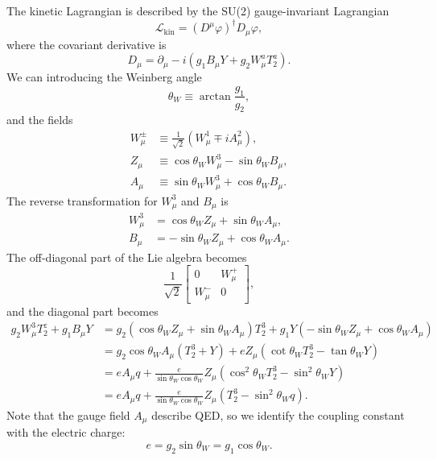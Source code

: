 \documentclass[aps,prb,superscriptaddress,nofootinbib]{revtex4}
\begin{document}
The kinetic Lagrangian is described by the SU(2) gauge-invariant Lagrangian
\begin{equation}
	\mathcal L_{\mathrm{kin}} = (D^\mu \varphi)^\dagger D_\mu \varphi,
\end{equation}
where the covariant derivative is
\begin{equation}
	D_\mu = \partial_\mu -i \left(g_1 B_\mu Y + g_2 W^a_\mu T_2^a\right).
\end{equation}
We can introducing the Weinberg angle
\begin{equation}
	\theta_W \equiv\arctan \frac{g_1}{g_2},
\end{equation}
and the fields
\begin{equation}
\begin{aligned}
	W_\mu^\pm &\equiv \frac{1}{\sqrt 2}(W^1_\mu \mp i A_\mu^2), \\
	Z_\mu &\equiv \cos{\theta_W} W^3_\mu - \sin{\theta_W} B_\mu, \\
	A_\mu &\equiv \sin{\theta_W} W_\mu^3 + \cos{\theta_W} B_\mu.
\end{aligned}
\end{equation}
The reverse transformation for $W_\mu^3$ and $B_\mu$ is
\begin{equation}
\begin{aligned}
	W_\mu^3 &= \cos{\theta_W} Z_\mu + \sin{\theta_W} A_\mu, \\
	B_\mu &= -\sin{\theta_W} Z_\mu +\cos{\theta_W} A_\mu.
\end{aligned}
\end{equation}
The off-diagonal part of the Lie algebra becomes
\begin{equation}
	\frac{1}{\sqrt 2}\begin{bmatrix}
		0 &  W^+_\mu \\
		W_\mu^- & 0
	\end{bmatrix},
\end{equation}
and the diagonal part becomes
\begin{equation}
\begin{aligned}
	g_2 W_\mu^3 T^z_2 + g_1 B_\mu Y
	&= g_2 (\cos{\theta_W} Z_\mu + \sin{\theta_W} A_\mu) T^3_2 + g_1 Y (-\sin{\theta_W} Z_\mu +\cos{\theta_W} A_\mu) \\
	&= g_2 \cos{\theta_W} A_\mu \left(T^3_2 + Y\right) + eZ_\mu \left(\cot{\theta_W}T_2^3 - \tan{\theta_W}Y \right) \\
	&= e A_\mu q + \frac{e}{\sin{\theta_W}\cos{\theta_W}} Z_\mu \left(\cos^2{\theta_W}T_2^3 - \sin^2{\theta_W} Y\right) \\
	&= e A_\mu q + \frac{e}{\sin{\theta_W}\cos{\theta_W}} Z_\mu \left(T_2^3 - \sin^2{\theta_W} q\right).
\end{aligned}
\end{equation}
Note that the gauge field $A_\mu$ describe QED, so we identify the coupling constant with the electric charge:
\begin{equation}
	e = g_2 \sin{\theta_W} = g_1 \cos{\theta_W}.
\end{equation}
\end{document}
